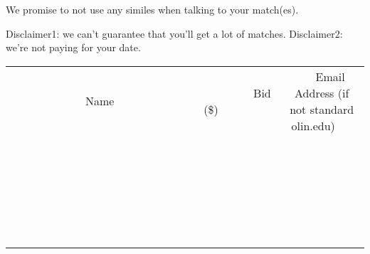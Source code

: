 \documentclass[11pt]{article}
\begin{document}
We promise to not use any similes when talking to your match(es). 

Disclaimer1: we can't guarantee that you'll get a lot of matches.
Disclaimer2: we're not paying for your date.
\\[6ex]
\begin{tabular}{c c c}
~~~~~~~~~~~~~Name~~~~~~~~~~~~~ & ~~~~~~~~~Bid (\$)~~~~~~~~~  & ~~~Email Address (if not standard olin.edu)~~~\\
 & & \\
\hline
 & & \\
\hline
 & & \\
\hline
 & & \\
\hline
 & & \\
\hline
 & & \\
\hline
 & & \\
\hline
 & & \\
\hline
 & & \\
\hline
 & & \\
\hline
 & & \\
\hline
 & & \\
\hline
 & & \\
\hline
 & & \\
\hline
 & & \\
\hline
 & & \\
\hline
 & & \\
\hline
 & & \\
\hline
 & & \\
\hline
 & & \\
\hline
 & & \\
\hline
 & & \\
\hline
 & & \\
\hline
 & & \\
\hline
 & & \\
\hline
 & & \\
\hline
\end{tabular}
\newpage
\end{document}
